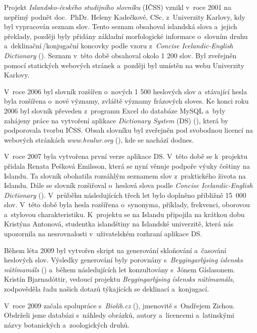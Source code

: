Projekt \textit{Islandsko-českého studijního slovníku} (IČSS) vznikl v~roce 2001 na nepřímý podnět doc. PhDr. Heleny Kadečkové, CSc. z~Univerzity Karlovy,
kdy byl vypracován seznam slov. 
Tento seznam obsahoval islandská slova a~jejich překlady, později byly přidány základní morfologické informace o~slovním druhu a~deklinační\,/\addthin konjugační koncovky podle vzoru z~\textit{Concise Icelandic-English Dictionary} (\cite {ic_en}). 
Seznam v~této době obsahoval okolo 1 200 slov. Byl zveřejněn pomocí statických webových stránek a~později byl umístěn na webu Univerzity Karlovy. 

V~roce 2006 byl slovník rozšířen o~nových 1 500 heslových slov a~stávající hesla byla rozšířena o~nové významy, zvláště významy frázových sloves. 
Ke konci roku 2006  byl slovník převeden z programu Excel do databáze MySQL a~byly zahájeny práce na vytvoření aplikace \textit{Dictionary System} (DS) (\cite {int19}), která by podporovala tvorbu IČSS. 
Obsah slovníku byl zveřejněn pod svobodnou licencí na webových stránkách \textit{www.hvalur.org} (\cite {int14}), kde se nachází dodnes. 

V~roce 2007 byla vytvořena první verze aplikace DS. V~této době se k~projektu přidala Renata Pešková Emilsson, která se nyní věnuje podpoře výuky češtiny na Islandu. 
Ta slovník obohatila rozsáhlým seznamem slov z~praktického života na Islandu. Dále se slovník rozšiřoval o~heslová slova podle \textit{Concise Icelandic-English Dictionary} (\cite {ic_en}). 
V průběhu následujících třech let bylo doplněno přibližně 15~000 slov. V této době byla hesla rozšířena o~synonyma, příklady, frekvenci, oborovou a~stylovou charakteristiku. K projektu se na Islandu připojila na krátkou dobu Kristýna Antonová, studentka islandštiny na Islandské univerzitě, která 
nás upozornila na nesrovnalosti v~uživatelském rozhraní aplikace DS.

Během léta 2009 byl vytvořen skript na generování skloňování a~časování heslových slov. Výsledky generování byly porovnány s~\textit{Beygingarlýsing íslensks nútímamáls} (\cite {DalvikVM}) a~během následujících let konzultovány
s~Jónem Gíslasonem. Kristín Bjarnadóttir, vedoucí projektu \textit{Beygingarlýsing íslensks nútímamáls}, zodpověděla řadu našich dotazů týkajících se deklinací a~konjugací.

V~roce 2009 začala spolupráce s~\textit{Biolib.cz} (\cite {int5}), jmenovitě s~Ondřejem Zichou. Obdrželi jsme  databázi s~náhledy obrázků, autory a~licencemi a~latinskými názvy botanických a~zoologických druhů.

